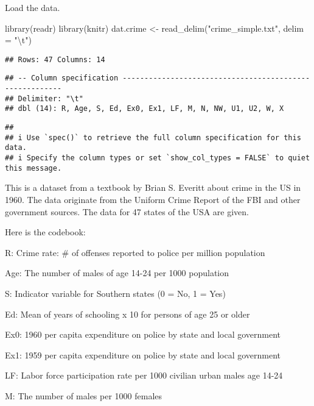 \documentclass[
]{article}
\newenvironment{Shaded}{\begin{snugshade}}{\end{snugshade}}
\newcommand{\AttributeTok}[1]{\textcolor[rgb]{0.77,0.63,0.00}{#1}}
\newcommand{\FunctionTok}[1]{\textcolor[rgb]{0.00,0.00,0.00}{#1}}
\newcommand{\NormalTok}[1]{#1}
\newcommand{\OtherTok}[1]{\textcolor[rgb]{0.56,0.35,0.01}{#1}}
\newcommand{\SpecialCharTok}[1]{\textcolor[rgb]{0.00,0.00,0.00}{#1}}
\newcommand{\StringTok}[1]{\textcolor[rgb]{0.31,0.60,0.02}{#1}}
\begin{document}
Load the data.

\begin{Shaded}
\begin{Highlighting}[]
\FunctionTok{library}\NormalTok{(readr)}
\FunctionTok{library}\NormalTok{(knitr)}
\NormalTok{dat.crime }\OtherTok{\textless{}{-}} \FunctionTok{read\_delim}\NormalTok{(}\StringTok{"crime\_simple.txt"}\NormalTok{, }\AttributeTok{delim =} \StringTok{"}\SpecialCharTok{\textbackslash{}t}\StringTok{"}\NormalTok{)}
\end{Highlighting}
\end{Shaded}

\begin{verbatim}
## Rows: 47 Columns: 14
\end{verbatim}

\begin{verbatim}
## -- Column specification --------------------------------------------------------
## Delimiter: "\t"
## dbl (14): R, Age, S, Ed, Ex0, Ex1, LF, M, N, NW, U1, U2, W, X
\end{verbatim}

\begin{verbatim}
## 
## i Use `spec()` to retrieve the full column specification for this data.
## i Specify the column types or set `show_col_types = FALSE` to quiet this message.
\end{verbatim}

This is a dataset from a textbook by Brian S. Everitt about crime in the
US in 1960. The data originate from the Uniform Crime Report of the FBI
and other government sources. The data for 47 states of the USA are
given.

Here is the codebook:

R: Crime rate: \# of offenses reported to police per million population

Age: The number of males of age 14-24 per 1000 population

S: Indicator variable for Southern states (0 = No, 1 = Yes)

Ed: Mean of years of schooling x 10 for persons of age 25 or older

Ex0: 1960 per capita expenditure on police by state and local government

Ex1: 1959 per capita expenditure on police by state and local government

LF: Labor force participation rate per 1000 civilian urban males age
14-24

M: The number of males per 1000 females
\end{document}
